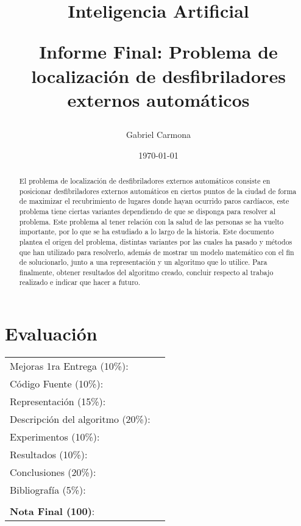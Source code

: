 \documentclass[letter, 10pt]{article}
\begin{document}
\title{Inteligencia Artificial \\ \begin{Large}Informe Final: Problema de localizaci\'on de desfibriladores externos autom\'aticos\end{Large}}
\author{Gabriel Carmona}
\date{\today}
\maketitle


\section*{Evaluaci\'on}

\begin{tabular}{ll}
Mejoras 1ra Entrega (10\%): &  \underline{\hspace{2cm}}\\
C\'odigo Fuente (10\%): &  \underline{\hspace{2cm}}\\
Representaci\'on (15\%):  & \underline{\hspace{2cm}} \\
Descripci\'on del algoritmo (20\%):  & \underline{\hspace{2cm}} \\
Experimentos (10\%):  & \underline{\hspace{2cm}} \\
Resultados (10\%):  & \underline{\hspace{2cm}} \\
Conclusiones (20\%): &  \underline{\hspace{2cm}}\\
Bibliograf\'ia (5\%): & \underline{\hspace{2cm}}\\
 &  \\
\textbf{Nota Final (100)}:   & \underline{\hspace{2cm}}
\end{tabular}

\begin{abstract}
El problema de localizaci\'on de desfibriladores externos autom\'aticos consiste en posicionar desfibriladores externos autom\'aticos en ciertos puntos de la ciudad de forma de maximizar el recubrimiento de lugares donde hayan ocurrido paros card\'iacos, este problema tiene ciertas variantes dependiendo de que se disponga para resolver al problema. Este problema al tener relaci\'on con la salud de las personas se ha vuelto importante, por lo que se ha estudiado a lo largo de la historia. Este documento plantea el origen del problema, distintas variantes por las cuales ha pasado y m\'etodos que han utilizado para resolverlo, adem\'as de mostrar un modelo matem\'atico con el fin de solucionarlo, junto a una representaci\'on y un algoritmo que lo utilice. Para finalmente, obtener resultados del algoritmo creado, concluir respecto al trabajo realizado e indicar que hacer a futuro.
\end{abstract}
\end{document}
